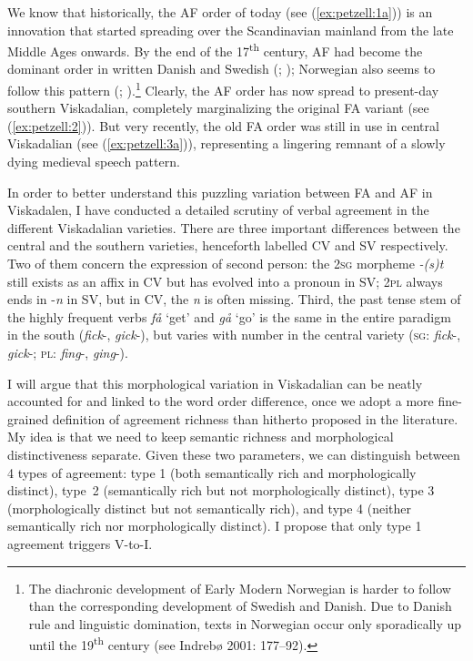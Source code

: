 \documentclass[output=paper,colorlinks,citecolor=brown,draft,draftmode]{langscibook}
\begin{document}
We know that historically, the AF order of today (see (\ref{ex:petzell:1a})) is an innovation that started spreading over the Scandinavian mainland from the late Middle Ages onwards. By the end of the 17\textsuperscript{th} century, AF had become the dominant order in written Danish \citep{Sundquist2003} and Swedish (\citealt{Falk1993}; \citealt{Hakansson2011}); Norwegian also seems to follow this pattern (\citealt{Christoffersen1997}; \citealt{Vitterso2004}).\footnote{The diachronic development of Early Modern Norwegian is harder to follow than the corresponding development of Swedish and Danish. Due to Danish rule and linguistic domination, texts in Norwegian occur only sporadically up until the 19\textsuperscript{th} century (see Indrebø 2001: 177–92).} Clearly, the AF order has now spread to present-day southern Viskadalian, completely marginalizing the original FA variant (see (\ref{ex:petzell:2})). But very recently, the old FA order was still in use in central Viskadalian (see (\ref{ex:petzell:3a})), representing a lingering remnant of a slowly dying medieval speech pattern.



In order to better understand this puzzling variation between FA and AF in Viskadalen, I have conducted a detailed scrutiny of verbal agreement in the different Viskadalian varieties. There are three important differences between the central and the southern varieties, henceforth labelled CV and SV respectively. Two of them concern the expression of second person: the 2\textsc{sg} morpheme \textit{-(s)t} still exists as an affix in CV but has evolved into a pronoun in SV; 2\textsc{pl} always ends in -\textit{n} in SV, but in CV, the \textit{n} is often missing. Third, the past tense stem of the highly frequent verbs \textit{få} ‘get’ and \textit{gå} ‘go’ is the same in the entire paradigm in the south (\textit{fick}-, \textit{gick}-), but varies with number in the central variety (\textsc{sg}: \textit{fick}-, \textit{gick}-; \textsc{pl}: \textit{fing}-, \textit{ging}-).



I will argue that this morphological variation in Viskadalian can be neatly accounted for and linked to the word order difference, once we adopt a more fine-grained definition of agreement richness than hitherto proposed in the literature. My idea is that we need to keep semantic richness and morphological distinctiveness separate. Given these two parameters, we can distinguish between 4 types of agreement: type 1 (both semantically rich and morphologically distinct), type~2 (semantically rich but not morphologically distinct), type 3 (morphologically distinct but not semantically rich), and type 4 (neither semantically rich nor morphologically distinct). I propose that only type 1 agreement triggers V-to-I.
\end{document}
